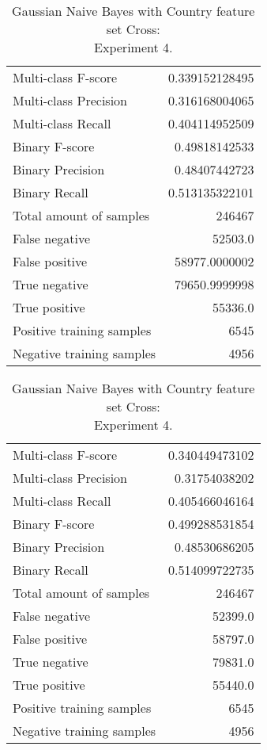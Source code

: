 \begin{table}[H]
\begin{minipage}{0.5\textwidth}
\caption{Gaussian Naive Bayes with Country feature set Cross: \\Experiment 3.}
\centering
\begin{tabular}{l r}
\toprule
Multi-class F-score & 0.339152128495 \\
Multi-class Precision & 0.316168004065 \\
Multi-class Recall & 0.404114952509 \\
\midrule
Binary F-score & 0.49818142533 \\
Binary Precision & 0.48407442723 \\
Binary Recall & 0.513135322101 \\
\midrule
Total amount of samples & 246467 \\
False negative & 52503.0 \\
False positive & 58977.0000002 \\
True negative & 79650.9999998 \\
True positive & 55336.0 \\
\midrule
Positive training samples & 6545 \\
Negative training samples & 4956 \\
\bottomrule
\end{tabular}
\end{minipage}
\hfillx
\begin{minipage}{0.5\textwidth}
\caption{Gaussian Naive Bayes with Country feature set Cross: \\Experiment 4.}
\centering
\begin{tabular}{l r}
\toprule
Multi-class F-score & 0.340449473102 \\
Multi-class Precision & 0.31754038202 \\
Multi-class Recall & 0.405466046164 \\
\midrule
Binary F-score & 0.499288531854 \\
Binary Precision & 0.48530686205 \\
Binary Recall & 0.514099722735 \\
\midrule
Total amount of samples & 246467 \\
False negative & 52399.0 \\
False positive & 58797.0 \\
True negative & 79831.0 \\
True positive & 55440.0 \\
\midrule
Positive training samples & 6545 \\
Negative training samples & 4956 \\
\bottomrule
\end{tabular}
\end{minipage}
\end{table}
